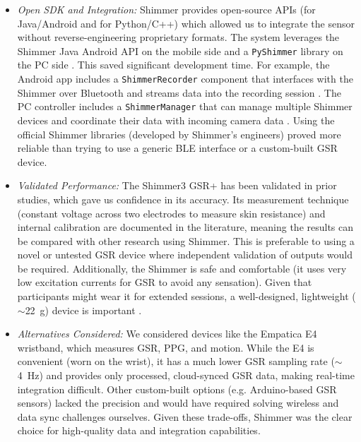\documentclass{report}
\begin{document}
\begin{itemize}
	\item \textit{Open SDK and Integration:} Shimmer provides open-source APIs (for Java/Android and for Python/C++) which allowed us to integrate the sensor without reverse-engineering proprietary formats. The system leverages the Shimmer Java Android API on the mobile side and a \texttt{PyShimmer} library on the PC side \cite{shimmerapi15}. This saved significant development time. For example, the Android app includes a \texttt{ShimmerRecorder} component that interfaces with the Shimmer over Bluetooth and streams data into the recording session \cite{shimmerapi15}. The PC controller includes a \texttt{ShimmerManager} that can manage multiple Shimmer devices and coordinate their data with incoming camera data \cite{shimmerapi15}. Using the official Shimmer libraries (developed by Shimmer's engineers) proved more reliable than trying to use a generic BLE interface or a custom-built GSR device.

	\item \textit{Validated Performance:} The Shimmer3 GSR+ has been validated in prior studies, which gave us confidence in its accuracy. Its measurement technique (constant voltage across two electrodes to measure skin resistance) and internal calibration are documented in the literature, meaning the results can be compared with other research using Shimmer. This is preferable to using a novel or untested GSR device where independent validation of outputs would be required. Additionally, the Shimmer is safe and comfortable (it uses very low excitation currents for GSR to avoid any sensation). Given that participants might wear it for extended sessions, a well-designed, lightweight ($\sim$22~g) device is important \cite{shimmerdoc8}.

	\item \textit{Alternatives Considered:} We considered devices like the Empatica E4 wristband, which measures GSR, PPG, and motion. While the E4 is convenient (worn on the wrist), it has a much lower GSR sampling rate ($\sim$4~Hz) and provides only processed, cloud-synced GSR data, making real-time integration difficult. Other custom-built options (e.g. Arduino-based GSR sensors) lacked the precision and would have required solving wireless and data sync challenges ourselves. Given these trade-offs, Shimmer was the clear choice for high-quality data and integration capabilities.
\end{itemize}
\end{document}
